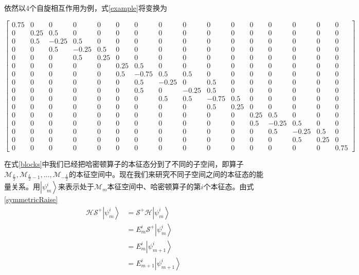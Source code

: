 \documentclass[UTF8,12pt]{article}
\providecommand\Ket[1]{\left|\right. #1 \left.\right\rangle}
\numberwithin{equation}{subsection}
\begin{document}
	依然以4个自旋相互作用为例，式\ref{example}将变换为
		\begin{tiny}
			\begin{equation}
				\nonumber
				\left[\begin{array}{r|rrrr|rrrrrr|rrrr|r}
					0.75&0&0&0&0&0&0&0&0&0&0&0&0&0&0&0\\
					\hline
					0&0.25&0.5&0&0&0&0&0&0&0&0&0&0&0&0&0\\
					0&0.5&-0.25&0.5&0&0&0&0&0&0&0&0&0&0&0&0\\
					0&0&0.5&-0.25&0.5&0&0&0&0&0&0&0&0&0&0&0\\
					0&0&0&0.5&0.25&0&0&0&0&0&0&0&0&0&0&0\\
					\hline
					0&0&0&0&0&0.25&0.5&0&0&0&0&0&0&0&0&0\\
					0&0&0&0&0&0.5&-0.75&0.5&0.5&0&0&0&0&0&0&0\\
					0&0&0&0&0&0&0.5&-0.25&0&0.5&0&0&0&0&0&0\\
					0&0&0&0&0&0&0.5&0&-0.25&0.5&0&0&0&0&0&0\\
					0&0&0&0&0&0&0&0.5&0.5&-0.75&0.5&0&0&0&0&0\\
					0&0&0&0&0&0&0&0&0&0.5&0.25&0&0&0&0&0\\
					\hline
					0&0&0&0&0&0&0&0&0&0&0&0.25&0.5&0&0&0\\
					0&0&0&0&0&0&0&0&0&0&0&0.5&-0.25&0.5&0&0\\
					0&0&0&0&0&0&0&0&0&0&0&0&0.5&-0.25&0.5&0\\
					0&0&0&0&0&0&0&0&0&0&0&0&0&0.5&0.25&0\\
					\hline
					0&0&0&0&0&0&0&0&0&0&0&0&0&0&0&0.75
				\end{array}\right]
			\end{equation}
		\end{tiny}
	
	在式\ref{blocks}中我们已经把哈密顿算子的本征态分到了不同的子空间，即算子\\$\mathcal M_{\frac{L}{2}},\mathcal M_{\frac{L}{2}-1},\dots,\mathcal M_{-\frac{L}{2}}$的本征空间中。现在我们来研究不同子空间之间的本征态的能量关系。用$\Ket{\psi^i_m}$来表示处于$\mathcal M_m$本征空间中、哈密顿算子的第$i$个本征态。由式\ref{symmetricRaise}
	\begin{align*}
		\mathcal {HS}^+\Ket{\psi^i_m} &= \mathcal S^+\mathcal H\Ket{\psi^i_m}\\
						   &= E^i_m\mathcal S^+\Ket{\psi^i_m}\\
						   &= E^i_m\Ket{\psi^i_{m+1}}\\
						   &= E^i_{m+1}\Ket{\psi^i_{m+1}}
	\end{align*}
	
\end{document}
